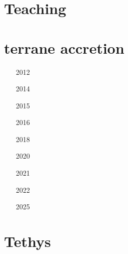 \section{Teaching} 

\begin{small}
\begin{itemize}
\item[\twothousandeleven]
\item[\twothousandfourteen]
\item[\twothousandnineteen] 
\item[\twothousandtwentyone] 
\end{itemize}
\end{small}

\section{terrane accretion} 

\begin{small}
\begin{itemize}
\item[2012] 
\item[2014] 
\item[2015] 
\item[2016] 
\item[2018] 
\item[2020] 
\item[2021] 
\item[2022] 
\item[2025] 
\end{itemize}
\end{small}

\section{Tethys} 

